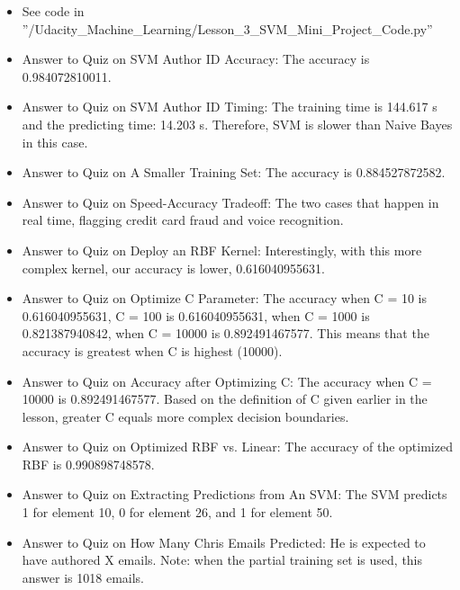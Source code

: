 \documentclass[12pt]{report}
\begin{document}
\begin{itemize}

\item See code in ''/Udacity\_Machine\_Learning/Lesson\_3\_SVM\_Mini\_Project\_Code.py''

\item Answer to Quiz on SVM Author ID Accuracy: The accuracy is 0.984072810011. 

\item Answer to Quiz on SVM Author ID Timing: The training time is 144.617 s and the predicting time: 14.203 s. Therefore, SVM is slower than Naive Bayes in this case. 

\item Answer to Quiz on A Smaller Training Set: The accuracy is 0.884527872582. 

\item Answer to Quiz on Speed-Accuracy Tradeoff: The two cases that happen in real time, flagging credit card fraud and voice recognition. 

\item Answer to Quiz on Deploy an RBF Kernel: Interestingly, with this more complex kernel, our accuracy is lower, 0.616040955631. 

\item Answer to Quiz on Optimize C Parameter: The accuracy when C = 10 is 0.616040955631, C = 100 is 0.616040955631, when C = 1000 is 0.821387940842, when C = 10000 is 0.892491467577. This means that the accuracy is greatest when C is highest (10000). 

\item Answer to Quiz on Accuracy after Optimizing C: The accuracy when C = 10000 is 0.892491467577. Based on the definition of C given earlier in the lesson, greater C equals more complex decision boundaries. 

\item Answer to Quiz on Optimized RBF vs. Linear: The accuracy of the optimized RBF is 0.990898748578. 

\item Answer to Quiz on Extracting Predictions from An SVM: The SVM predicts 1 for element 10, 0 for element 26, and 1 for element 50.

\item Answer to Quiz on How Many Chris Emails Predicted: He is expected to have authored X emails. Note: when the partial training set is used, this answer is 1018 emails. 

\end{itemize}
\end{document}

